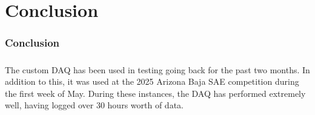 \chapter{Conclusion}

\subsection{Conclusion}

\paragraph{}
The custom DAQ has been used in testing going back for the past two months.
In addition to this, it was used at the 2025 Arizona Baja SAE competition during the first week of May.
During these instances, the DAQ has performed extremely well, having logged over 30 hours worth of data.